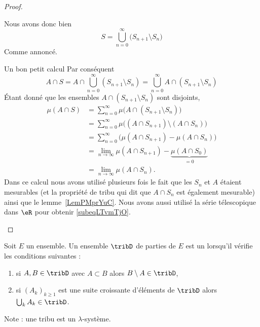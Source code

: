 \begin{proof}
\begin{subproof}
		Nous avons donc bien
		\begin{equation}
			S=\bigcup_{n=0}^{\infty}\big( S_{n+1}\setminus S_n \big)
		\end{equation}
		Comme annoncé.
		\item[Un bon petit calcul]
		Par conséquent
		\begin{equation}
			A\cap S = A\cap\bigcup_{n=0}^{\infty}(S_{n+1}\setminus S_n)
			= \bigcup_{n=0}^{\infty}A\cap(S_{n+1}\setminus S_n)
		\end{equation}
		Étant donné que les ensembles \( A\cap(S_{n+1}\setminus S_n)\) sont disjoints,
		\begin{subequations}
			\begin{align}
				\mu(A\cap S) & =\sum_{n=0}^{\infty}\mu\big( A\cap(S_{n+1}\setminus S_n) \big)                                 \\
				             & =\sum_{n=0}^{\infty}\mu\Big( (A\cap S_{n+1})\setminus (A\cap S_n) \Big)                        \\
				             & =\sum_{n=0}^{\infty}\big( \mu(A\cap S_{n+1})-\mu(A\cap S_n) \big)                              \\
				             & =\lim_{n\to \infty} \mu(A\cap S_{n+1})-\underbrace{\mu(A\cap S_0)}_{=0}   \label{subeqLTvmTjO} \\
				             & =\lim_{n\to \infty} \mu(A\cap S_n).
			\end{align}
		\end{subequations}
		Dans ce calcul nous avons utilisé plusieurs fois le fait que les \( S_n\) et \( A\) étaient mesurables (et la propriété de tribu qui dit que \( A\cap S_n\) est également mesurable) ainsi que le lemme~\ref{LemPMprYuC}. Nous avons aussi utilisé la série télescopique dans \( \eR\) pour obtenir \eqref{subeqLTvmTjO}.
	\end{subproof}
\end{proof}

\begin{definition}      \label{DefRECXooWwYgej}
	Soit \( E\) un ensemble. Un ensemble \( \tribD\) de parties de \( E\) est un  lorsqu'il vérifie les conditions suivantes :
	\begin{enumerate}
		\item
		      si \( A,B\in\tribD\) avec \( A\subset B\) alors \( B\setminus A\in \tribD\),
		\item
		      si \( (A_k)_{k\geq 1}\) est une suite croissante d'éléments de \( \tribD\) alors \( \bigcup_kA_k\in\tribD\).
	\end{enumerate}
\end{definition}
Note : une tribu est un \( \lambda\)-système.

